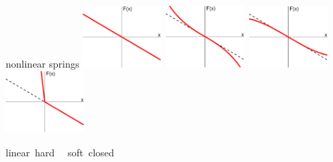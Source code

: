 \documentclass[dvipsnames,colorlinks]{beamer}
\begin{document}
\begin{frame}{nonlinear springs}
\mbox{\includegraphics[width=0.22\textwidth]{figs/spring-linear} \quad
\includegraphics[width=0.22\textwidth]{figs/spring-hard} \quad
\includegraphics[width=0.22\textwidth]{figs/spring-soft} \quad
\includegraphics[width=0.22\textwidth]{figs/spring-closed}}

\mbox{\qquad linear \qquad\qquad\quad hard \qquad\qquad\quad\,\, soft \qquad\qquad\quad closed}
\end{frame}
\end{document}
